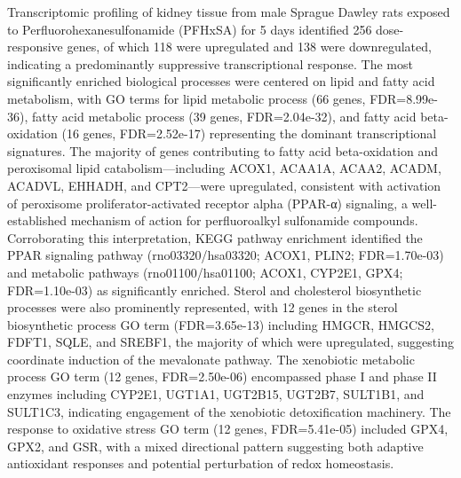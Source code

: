 Transcriptomic profiling of kidney tissue from male Sprague Dawley rats exposed to Perfluorohexanesulfonamide (PFHxSA) for 5 days identified 256 dose-responsive genes, of which 118 were upregulated and 138 were downregulated, indicating a predominantly suppressive transcriptional response. The most significantly enriched biological processes were centered on lipid and fatty acid metabolism, with GO terms for lipid metabolic process (66 genes, FDR=8.99e-36), fatty acid metabolic process (39 genes, FDR=2.04e-32), and fatty acid beta-oxidation (16 genes, FDR=2.52e-17) representing the dominant transcriptional signatures. The majority of genes contributing to fatty acid beta-oxidation and peroxisomal lipid catabolism—including ACOX1, ACAA1A, ACAA2, ACADM, ACADVL, EHHADH, and CPT2—were upregulated, consistent with activation of peroxisome proliferator-activated receptor alpha (PPAR-α) signaling, a well-established mechanism of action for perfluoroalkyl sulfonamide compounds. Corroborating this interpretation, KEGG pathway enrichment identified the PPAR signaling pathway (rno03320/hsa03320; ACOX1, PLIN2; FDR=1.70e-03) and metabolic pathways (rno01100/hsa01100; ACOX1, CYP2E1, GPX4; FDR=1.10e-03) as significantly enriched. Sterol and cholesterol biosynthetic processes were also prominently represented, with 12 genes in the sterol biosynthetic process GO term (FDR=3.65e-13) including HMGCR, HMGCS2, FDFT1, SQLE, and SREBF1, the majority of which were upregulated, suggesting coordinate induction of the mevalonate pathway. The xenobiotic metabolic process GO term (12 genes, FDR=2.50e-06) encompassed phase I and phase II enzymes including CYP2E1, UGT1A1, UGT2B15, UGT2B7, SULT1B1, and SULT1C3, indicating engagement of the xenobiotic detoxification machinery. The response to oxidative stress GO term (12 genes, FDR=5.41e-05) included GPX4, GPX2, and GSR, with a mixed directional pattern suggesting both adaptive antioxidant responses and potential perturbation of redox homeostasis.

